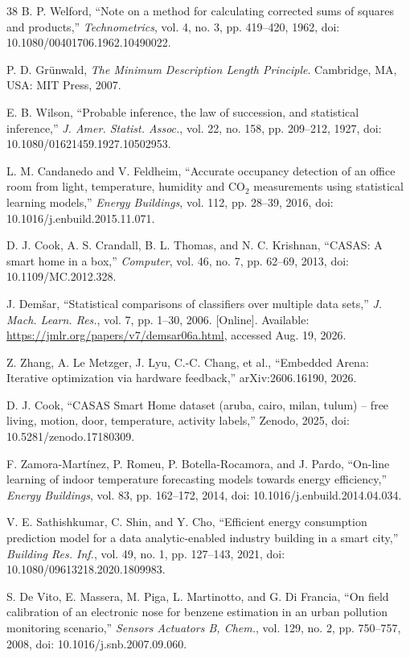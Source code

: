 \documentclass[11pt,a4paper]{article}
\begin{document}
\begin{thebibliography}{38}
 B. P. Welford, ``Note on a method for calculating corrected sums
of squares and products,'' \emph{Technometrics}, vol. 4, no. 3, pp. 419--420,
1962, doi: 10.1080/00401706.1962.10490022.

 P. D. Gr\"unwald, \emph{The Minimum Description Length Principle}.
Cambridge, MA, USA: MIT Press, 2007.

 E. B. Wilson, ``Probable inference, the law of succession, and
statistical inference,'' \emph{J. Amer. Statist. Assoc.}, vol. 22, no. 158,
pp. 209--212, 1927, doi: 10.1080/01621459.1927.10502953.

 L. M. Candanedo and V. Feldheim, ``Accurate occupancy detection
of an office room from light, temperature, humidity and CO$_2$ measurements
using statistical learning models,'' \emph{Energy Buildings}, vol. 112, pp.
28--39, 2016, doi: 10.1016/j.enbuild.2015.11.071.

 D. J. Cook, A. S. Crandall, B. L. Thomas, and N. C. Krishnan,
``CASAS: A smart home in a box,'' \emph{Computer}, vol. 46, no. 7, pp.
62--69, 2013, doi: 10.1109/MC.2012.328.

 J. Dem\v{s}ar, ``Statistical comparisons of classifiers over
multiple data sets,'' \emph{J. Mach. Learn. Res.}, vol. 7, pp. 1--30, 2006.
[Online]. Available: \url{https://jmlr.org/papers/v7/demsar06a.html}, accessed
Aug. 19, 2026.

 Z. Zhang, A. Le Metzger, J. Lyu, C.-C. Chang, et al., ``Embedded
Arena: Iterative optimization via hardware feedback,'' arXiv:2606.16190,
2026.

 D. J. Cook, ``CASAS Smart Home dataset (aruba, cairo, milan,
tulum) -- free living, motion, door, temperature, activity labels,'' Zenodo,
2025, doi: 10.5281/zenodo.17180309.

 F. Zamora-Mart\'inez, P. Romeu, P. Botella-Rocamora, and J.
Pardo, ``On-line learning of indoor temperature forecasting models towards
energy efficiency,'' \emph{Energy Buildings}, vol. 83, pp. 162--172, 2014,
doi: 10.1016/j.enbuild.2014.04.034.

 V. E. Sathishkumar, C. Shin, and Y. Cho, ``Efficient energy
consumption prediction model for a data analytic-enabled industry building in
a smart city,'' \emph{Building Res. Inf.}, vol. 49, no. 1, pp. 127--143,
2021, doi: 10.1080/09613218.2020.1809983.

 S. De Vito, E. Massera, M. Piga, L. Martinotto, and G. Di
Francia, ``On field calibration of an electronic nose for benzene estimation
in an urban pollution monitoring scenario,'' \emph{Sensors Actuators B,
Chem.}, vol. 129, no. 2, pp. 750--757, 2008, doi: 10.1016/j.snb.2007.09.060.


\end{thebibliography}
\end{document}
